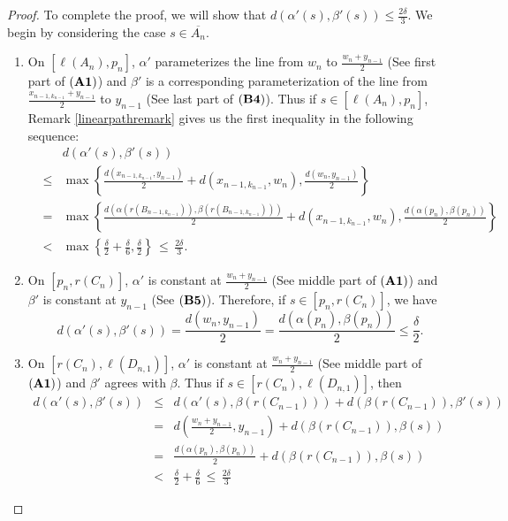 \documentclass[12pt, leqno]{amsart}
\newcommand{\ov}{\overline}
\theoremstyle{definition}\newtheorem{definition}[theorem]{Definition}
\begin{document}
\begin{proof}
To complete the proof, we will show that $d(\alpha '(s),\beta '(s))\leq \frac{2\delta}{3}$. We begin by considering the case $s\in \ov{A_n}$.

\begin{enumerate}
    \item On $[\ell(A_n), p_n]$, $\alpha '$ parameterizes the line from $w_n$ to $\frac{w_n+y_{n-1}}{2}$  (See first part of $\bf (A1)$) and $\beta '$ is a corresponding parameterization of the line from $\frac{x_{n-1, k_{n-1}}+y_{n-1}}{2}$ to $y_{n-1}$  (See last part of $\bf (B4)$). Thus if $s\in [\ell(A_n), p_n]$, Remark \ref{linearpathremark} gives us the first inequality in the following sequence:\\
    \begin{eqnarray*}
     & & d(\alpha '(s),\beta '(s))  \\
    &\leq& \max\left\{\frac{d(x_{n-1, k_{n-1}},y_{n-1})}{2}+d(x_{n-1, k_{n-1}},w_n),\frac{d(w_n,y_{n-1})}{2}\right\}\\
    & =&  \max\left\{\frac{d(\alpha(r(B_{n-1, k_{n-1}})),\beta(r(B_{n-1, k_{n-1}})))}{2}+d(x_{n-1, k_{n-1}},w_n),\frac{d(\alpha(p_n),\beta(p_n))}{2}\right\}\\
    &<& \max\left\{\frac{\delta}{2}+\frac{\delta}{6},\frac{\delta}{2}\right\} \,\leq \, \frac{2\delta}{3}.
    \end{eqnarray*}

    \item On $[p_n,r(C_n)]$, $\alpha '$ is constant at $\frac{w_n+y_{n-1}}{2}$  (See middle part of $\bf (A1)$) and $\beta '$ is constant at $y_{n-1}$  (See $\bf (B5)$). Therefore, if $s\in [p_n,r(C_n)]$, we have \[d(\alpha '(s),\beta '(s))=\frac{d(w_n,y_{n-1})}{2}=\frac{d(\alpha(p_n),\beta(p_n))}{2}\leq\frac{\delta}{2}.\]

    \item On $[r(C_n),\ell(D_{n,1})]$, $\alpha '$ is constant at $\frac{w_n+y_{n-1}}{2}$  (See middle part of $\bf (A1)$) and $\beta '$ agrees with $\beta$. Thus if $s\in [r(C_n),\ell(D_{n,1})]$, then
    \begin{eqnarray*}
    d(\alpha '(s),\beta '(s)) &\leq & d(\alpha '(s),\beta(r(C_{n-1})))+d(\beta(r(C_{n-1})),\beta ' (s))\\
    &= & d\left(\frac{w_n+y_{n-1}}{2},y_{n-1}\right)+d(\beta(r(C_{n-1})),\beta  (s))\\
    &= & \frac{d(\alpha(p_n),\beta(p_n))}{2}+d(\beta(r(C_{n-1})),\beta  (s))\\
    &< & \frac{\delta}{2}+\frac{\delta}{6} \, \leq  \,\frac{2\delta}{3}
    \end{eqnarray*}


\end{enumerate}
\end{proof}
\end{document}
